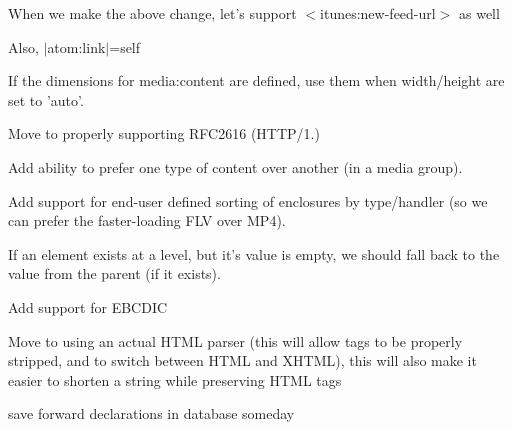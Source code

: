\begin{DoxyRefList}
When we make the above change, let's support $<$itunes\-:new-\/feed-\/url$>$ as well 

Also, $|$atom\-:link$|$=self  
\item[\label{todo__todo000026}%
\hypertarget{todo__todo000026}{}%
Member \hyperlink{class_simple_pie___enclosure_a171c729bb673362252cb60a05074d6b1}{Simple\-Pie\-\_\-\-Enclosure\-:\-:embed} (\$options= '', \$native=false)]If the dimensions for media\-:content are defined, use them when width/height are set to 'auto'.  
\item[\label{todo__todo000020}%
\hypertarget{todo__todo000020}{}%
Class \hyperlink{class_simple_pie___file}{Simple\-Pie\-\_\-\-File} ]Move to properly supporting R\-F\-C2616 (H\-T\-T\-P/1.)  
\item[\label{todo__todo000024}%
\hypertarget{todo__todo000024}{}%
Member \hyperlink{class_simple_pie___item_ac85b2c315eb4406b87f61590599d51af}{Simple\-Pie\-\_\-\-Item\-:\-:get\-\_\-enclosure} (\$key=0, \$prefer=null)]Add ability to prefer one type of content over another (in a media group).  
\item[\label{todo__todo000025}%
\hypertarget{todo__todo000025}{}%
Member \hyperlink{class_simple_pie___item_ac1e540310fe97afa7fd20472ffa624b5}{Simple\-Pie\-\_\-\-Item\-:\-:get\-\_\-enclosures} ()]Add support for end-\/user defined sorting of enclosures by type/handler (so we can prefer the faster-\/loading F\-L\-V over M\-P4). 

If an element exists at a level, but it's value is empty, we should fall back to the value from the parent (if it exists).  
\item[\label{todo__todo000027}%
\hypertarget{todo__todo000027}{}%
Member \hyperlink{class_simple_pie___misc_a2fc183050056ea622461fd169967cd0a}{Simple\-Pie\-\_\-\-Misc\-:\-:xml\-\_\-encoding} (\$data)]Add support for E\-B\-C\-D\-I\-C  
\item[\label{todo__todo000021}%
\hypertarget{todo__todo000021}{}%
Class \hyperlink{class_simple_pie___sanitize}{Simple\-Pie\-\_\-\-Sanitize} ]Move to using an actual H\-T\-M\-L parser (this will allow tags to be properly stripped, and to switch between H\-T\-M\-L and X\-H\-T\-M\-L), this will also make it easier to shorten a string while preserving H\-T\-M\-L tags  
\item[\label{todo__todo000054}%
\hypertarget{todo__todo000054}{}%
Member \hyperlink{class_symbol_database_a49c0ed07b100ca46f2df82ef8ea01cba}{Symbol\-Database\-:\-:Symbol\-Database} (const \hyperlink{class_tokenizer}{Tokenizer} $\ast$tokenizer, const \hyperlink{class_settings}{Settings} $\ast$settings, \hyperlink{class_error_logger}{Error\-Logger} $\ast$error\-Logger)]save forward declarations in database someday 


\end{DoxyRefList}
